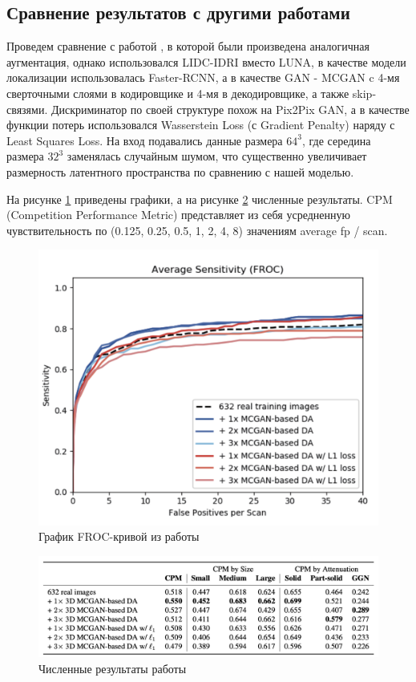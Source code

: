 \subsection{Сравнение результатов с другими работами}

Проведем сравнение с работой \cite{han2019synthesizing}, в которой были произведена аналогичная аугментация, однако использовался LIDC-IDRI вместо LUNA, в качестве модели локализации использовалась Faster-RCNN, а в качестве GAN - MCGAN c 4-мя сверточными слоями в кодировщике и 4-мя в декодировщике, а также skip-связями. Дискриминатор по своей структуре похож на Pix2Pix GAN, а в качестве функции потерь использовался Wasserstein Loss (с Gradient Penalty) наряду с Least Squares Loss. На вход подавались данные размера $64^3$, где середина размера $32^3$ заменялась случайным шумом, что существенно увеличивает размерность латентного пространства по сравнению с нашей моделью.

На рисунке \ref{han-froc-plot} приведены графики, а на рисунке \ref{han-cpm} численные результаты. CPM (Competition Performance Metric) представляет из себя усредненную чувствительность по (0.125, 0.25, 0.5, 1, 2, 4, 8) значениям average fp / scan.

\begin{figure}[!h]
\includegraphics[width=\linewidth]{images/mcgan-results.png}
\caption{График FROC-кривой из работы \cite{han2019synthesizing}}\label{han-froc-plot}
\centering
\end{figure}

\begin{figure}[!h]
\includegraphics[width=\linewidth]{images/han-cpm.png}
\caption{Численные результаты работы \cite{han2019synthesizing}}\label{han-cpm}
\centering
\end{figure}